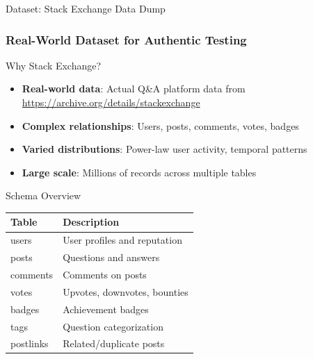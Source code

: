 \documentclass{beamer}
\begin{document}
\begin{frame}{Dataset: Stack Exchange Data Dump}
\frametitle{Real-World Dataset for Authentic Testing}

\begin{block}{Why Stack Exchange?}
\begin{itemize}
    \item \textbf{Real-world data}: Actual Q\&A platform data from \url{https://archive.org/details/stackexchange}
    \item \textbf{Complex relationships}: Users, posts, comments, votes, badges
    \item \textbf{Varied distributions}: Power-law user activity, temporal patterns
    \item \textbf{Large scale}: Millions of records across multiple tables
\end{itemize}
\end{block}

\begin{exampleblock}{Schema Overview}
\begin{tabular}{ll}
\toprule
Table & Description \\
\midrule
users & User profiles and reputation \\
posts & Questions and answers \\
comments & Comments on posts \\
votes & Upvotes, downvotes, bounties \\
badges & Achievement badges \\
tags & Question categorization \\
postlinks & Related/duplicate posts \\
\bottomrule
\end{tabular}
\end{exampleblock}

\end{frame}
\end{document}
